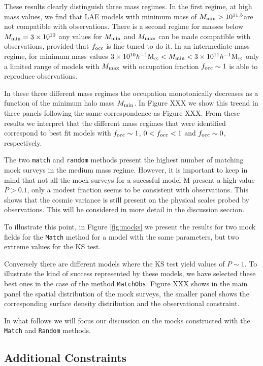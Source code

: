 \documentclass[usenatbib]{mn2e}
\newcommand{\hMsun}{{\ifmmode{h^{-1}{\rm {M_{\odot}}}}\else{$h^{-1}{\rm{M_{\odot}}}$}\fi}}
\begin{document}
These results clearly distinguish three mass regimes. In the first regime, at
high mass values, we find that LAE models with minimum mass of $M_{\rm
  min}>10^{11.5}$\hMsun are not compatible with observations. There is
a second regime for masses below $M_{\rm
  min}=3\times 10^{10}$ any values for $M_{\rm min}$ and $M_{\rm max}$
can be made compatible with observations, provided that
$f_{\rm occ}$ is fine tuned to do it. In an intermediate mass regime,
for minimum mass values $3\times 10^{10}\hMsun < M_{\rm min}< 3\times 10^{11}\hMsun$ only a
limited range of models with $M_{\rm max}$ with occupation fraction
$f_{\rm occ}\sim 1$ is able to reproduce observations. 

In these three different mass regimes the occupation monotonically
decreases as a function of the minimum halo mass $M_{\rm min}$. In
Figure XXX we show this treend in three panels following the same
correspondence as Figure XXX. From these results we interpret that the
different mass regimes that were identified correspond to best fit
models with $f_{\rm occ}\sim 1$, $0<f_{\rm occ}<1$ and $f_{\rm
  occ}\sim 0$, respectively. 

The two {\tt match} and {\tt random} methods present the highest
number of matching mock surveys in the medium mass regime. However, it
is important to keep in mind that not all the mock surveys for a
sucessful model ${\mathrm M}$ present a high value $P>0.1$, only a
modest fraction seems to be consistent with observations. This shows that the
cosmic variance is still present on the physical scales probed by
observations. This will be considered in more detail in the discussion
seccion. 

To illustrate this point, in Figure \ref{fig:mocks} we present the
results for two mock fields for the {\tt{Match}} method for a model
with the same parameters, but two extreme values for the KS test. 


Conversely there are different models where the KS test yield values of
$P\sim 1$. To illustrate the kind of success represented by these
models, we have selected these best ones in the case of the method
{\tt{MatchObs}}. Figure XXX shows in the main panel the spatial
distribution of the mock surveys, the smaller panel shows the
corresponding surface density distribution and the observational
constraint.  

In what follows we will focus our discussion on the mocks constructed
with the {\tt{Match}} and {\tt{Random}} methods. 

\subsection{Additional Constraints}
\end{document}
